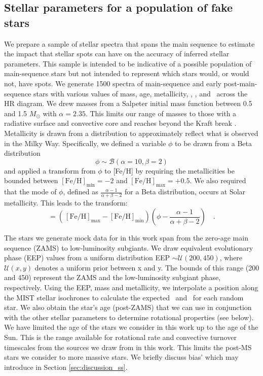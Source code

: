 \subsection{Stellar parameters for a population of fake stars}
\label{sec:stellar_parameters}
We prepare a sample of stellar spectra that spans the main sequence to estimate the impact that stellar spots can have on the accuracy of inferred stellar parameters. This sample is intended to be indicative of a possible population of main-sequence stars but not intended to represent which stars would, or would not, have spots.
We generate 1500 spectra of main-sequence and early post-main-sequence stars with various values of mass, age, metallicity, \vsini, \fspot, and \xspot\ across the HR diagram.
We drew masses from a Salpeter initial mass function \citep{salpeter_luminosity_1955} between 0.5 and 1.5 $M_\odot$ with $\alpha = 2.35$. This limits our range of masses to those with a radiative surface and convective core and reaches beyond the Kraft break \citep{kraft_studies_1967}. Metallicity is drawn from a distribution to approximately reflect what is observed in the Milky Way. Specifically, we defined a variable $\phi$ to be drawn from a Beta distribution
\begin{equation}
    \phi \sim \mathcal{B}\left(\alpha=10, \beta=2\right)
\end{equation}
and applied a transform from $\phi$ to [Fe/H] by requiring the metallicities be bounded between $[\mathrm{Fe/H}]_\mathrm{min} =-2$ and $[\mathrm{Fe/H}]_\mathrm{max} = +0.5$. We also required that the mode of $\phi$, defined as $\frac{\alpha - 1}{\alpha + \beta - 2}$ for a Beta distribution, occurs at Solar metallicity. This leads to the transform:
\begin{equation}
    [\mathrm{Fe/H}] = \left(\frac{}{}[\mathrm{Fe/H}]_\mathrm{max}-[\mathrm{Fe/H}]_\mathrm{min}\right)\left(\phi - \frac{\alpha - 1}{\alpha + \beta - 2}\right) \quad .
\end{equation}

The stars we generate mock data for in this work span from the zero-age main sequence (ZAMS) to low-luminosity subgiants. We draw equivalent evolutionary phase (EEP) values from a uniform distribution EEP $\sim \mathcal{U}(200,450)$, where $\mathcal{U}\left(x,y\right)$ denotes a uniform prior between x and y.
The bounds of this range (200 and 450) represent the ZAMS and the low-luminosity subgiant phase, respectively. 
Using the EEP, mass and metallicity, we interpolate a position along the MIST stellar isochrones \citep{morton_isochrones_2015} to calculate the expected \teff\ and \logg\ for each random star. We also obtain the star's age (post-ZAMS) that we can use in conjunction with the other stellar parameters to determine rotational properties (see below). We have limited the age of the stars we consider in this work up to the age of the Sun. This is the range available for rotational rate and convective turnover timescales from the sources we draw from in this work. This limits the post-MS stars we consider to more massive stars. We briefly discuss bias' which may introduce in Section \ref{sec:discussion_ss}.

